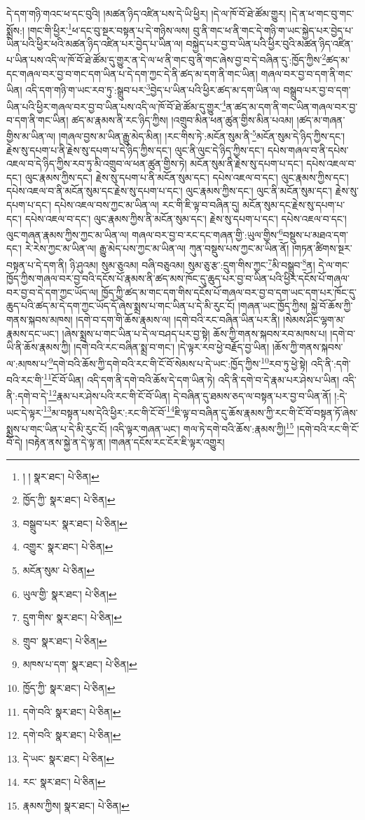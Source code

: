 དེ་དག་གཉི་གའང་ཕ་དང་བུའི། །མཚན་ཉིད་འཛིན་པས་དེ་ཡི་ཕྱིར། །དེ་ལ་ཁོ་བོ་ཐེ་ཚོམ་གྱུར། །དེ་ན་ཕ་གང་བུ་གང་སྨྲོས:། །གང་གི་ཕྱིར་\footnote{། །  སྣར་ཐང་།  པེ་ཅིན། }ཕ་དང་བུ་སྔར་བསྟན་པ་དེ་གཉིས་ལས། བུ་ནི་གང་ཕ་ནི་གང་དེ་གཉི་ག་ཡང་སྐྱེད་པར་བྱེད་པ་ཡིན་པའི་ཕྱིར་ཕའི་མཚན་ཉིད་འཛིན་པར་བྱེད་པ་ཡིན་ལ། བསྐྱེད་པར་བྱ་བ་ཡིན་པའི་ཕྱིར་བུའི་མཚན་ཉིད་འཛིན་པ་ཡིན་པས་འདི་ལ་ཁོ་བོ་ཐེ་ཚོམ་དུ་གྱུར་ན་དེ་ལ་ཕ་ནི་གང་བུ་ནི་གང་ཞེས་བྱ་བ་དེ་བཞིན་དུ་:ཁྱོད་ཀྱིས་\footnote{ཁྱོད་ཀྱི་  སྣར་ཐང་།  པེ་ཅིན། }ཚད་མ་དང་གཞལ་བར་བྱ་བ་གང་དག་ཡིན་པ་དེ་དག་ཀྱང་དེ་ནི་ཚད་མ་དག་ནི་གང་ཡིན། གཞལ་བར་བྱ་བ་དག་ནི་གང་ཡིན། འདི་དག་གཉི་ག་ཡང་རབ་ཏུ་:སྒྲུབ་པར་\footnote{བསྒྲུབ་པར་  སྣར་ཐང་།  པེ་ཅིན། }བྱེད་པ་ཡིན་པའི་ཕྱིར་ཚད་མ་དག་ཡིན་ལ། བསྒྲུབ་པར་བྱ་བ་དག་ཡིན་པའི་ཕྱིར་གཞལ་བར་བྱ་བ་ཡིན་པས་འདི་ལ་ཁོ་བོ་ཐེ་ཚོམ་དུ་གྱུར་\footnote{འགྱུར་  སྣར་ཐང་།  པེ་ཅིན། }ན་ཚད་མ་དག་ནི་གང་ཡིན་གཞལ་བར་བྱ་བ་དག་ནི་གང་ཡིན། ཚད་མ་རྣམས་ནི་རང་ཉིད་ཀྱིས། །འགྲུབ་མིན་ཕན་ཚུན་གྱིས་མིན་པའམ། །ཚད་མ་གཞན་གྱིས་མ་ཡིན་ལ། །གཞལ་བྱས་མ་ཡིན་རྒྱུ་མེད་མིན། །རང་གིས་ཏེ་:མངོན་སུམ་ནི་\footnote{མངོན་སུམ་  པེ་ཅིན། }མངོན་སུམ་དེ་ཉིད་ཀྱིས་དང་། རྗེས་སུ་དཔག་པ་ནི་རྗེས་སུ་དཔག་པ་དེ་ཉིད་ཀྱིས་དང་། ལུང་ནི་ལུང་དེ་ཉིད་ཀྱིས་དང་། དཔེས་གཞལ་བ་ནི་དཔེས་འཇལ་བ་དེ་ཉིད་ཀྱིས་རབ་ཏུ་མི་འགྲུབ་ལ་ཕན་ཚུན་གྱིས་ཏེ། མངོན་སུམ་ནི་རྗེས་སུ་དཔག་པ་དང་། དཔེས་འཇལ་བ་དང་། ལུང་རྣམས་ཀྱིས་དང་། རྗེས་སུ་དཔག་པ་ནི་མངོན་སུམ་དང་། དཔེས་འཇལ་བ་དང་། ལུང་རྣམས་ཀྱིས་དང་། དཔེས་འཇལ་བ་ནི་མངོན་སུམ་དང་རྗེས་སུ་དཔག་པ་དང་། ལུང་རྣམས་ཀྱིས་དང་། ལུང་ནི་མངོན་སུམ་དང་། རྗེས་སུ་དཔག་པ་དང་། དཔེས་འཇལ་བས་ཀྱང་མ་ཡིན་ལ། རང་གི་ཇི་ལྟ་བ་བཞིན་དུ། མངོན་སུམ་དང་རྗེས་སུ་དཔག་པ་དང་། དཔེས་འཇལ་བ་དང་། ལུང་རྣམས་ཀྱིས་ནི་མངོན་སུམ་དང་། རྗེས་སུ་དཔག་པ་དང་། དཔེས་འཇལ་བ་དང་། ལུང་གཞན་རྣམས་ཀྱིས་ཀྱང་མ་ཡིན་ལ། གཞལ་བར་བྱ་བ་རང་དང་གཞན་གྱི་:ཡུལ་གྱིས་\footnote{ཡུལ་གྱི་  སྣར་ཐང་།  པེ་ཅིན། }བསྡུས་པ་མཐའ་དག་དང་། རེ་རེས་ཀྱང་མ་ཡིན་ལ། རྒྱུ་མེད་པས་ཀྱང་མ་ཡིན་ལ། ཀུན་བསྡུས་པས་ཀྱང་མ་ཡིན་ནོ། །གཏན་ཚིགས་སྔར་བསྟན་པ་དེ་དག་ནི། ཉི་ཤུའམ། སུམ་ཅུའམ། བཞི་བཅུའམ། སུམ་ཅུ་རྩ་:དྲུག་གིས་ཀྱང་\footnote{དྲུག་གིས་  སྣར་ཐང་།  པེ་ཅིན། }མི་བསྒྲུབ་\footnote{གྲུབ་  སྣར་ཐང་།  པེ་ཅིན། }ན། དེ་ལ་གང་ཁྱོད་ཀྱིས་གཞལ་བར་བྱ་བའི་དངོས་པོ་རྣམས་ནི་ཚད་མས་ཁོང་དུ་ཆུད་པར་བྱ་བ་ཡིན་པའི་ཕྱིར་དངོས་པོ་གཞལ་བར་བྱ་བ་དེ་དག་ཀྱང་ཡོད་ལ། ཁྱོད་ཀྱི་ཚད་མ་གང་དག་གིས་དངོས་པོ་གཞལ་བར་བྱ་བ་དག་ཡང་དག་པར་ཁོང་དུ་ཆུད་པའི་ཚད་མ་དེ་དག་ཀྱང་ཡོད་དོ་ཞེས་སྨྲས་པ་གང་ཡིན་པ་དེ་མི་རུང་ངོ། །གཞན་ཡང་ཁྱོད་ཀྱིས། སྐྱེ་བོ་ཆོས་ཀྱི་གནས་སྐབས་མཁས། །དགེ་བ་དག་གི་ཆོས་རྣམས་ལ། །དགེ་བའི་རང་བཞིན་ཡིན་པར་ནི། །སེམས་ཤིང་ལྷག་མ་རྣམས་དང་ཡང་། །ཞེས་སྨྲས་པ་གང་ཡིན་པ་དེ་ལ་བཤད་པར་བྱ་སྟེ། ཆོས་ཀྱི་གནས་སྐབས་རབ་མཁས་པ། །དགེ་བ་ཡི་ནི་ཆོས་རྣམས་ཀྱི། །དགེ་བའི་རང་བཞིན་སྨྲ་བ་གང་། །དེ་ལྟར་རབ་ཕྱེ་བརྗོད་བྱ་ཡིན། །ཆོས་ཀྱི་གནས་སྐབས་ལ་:མཁས་པ་\footnote{མཁས་པ་དག་  སྣར་ཐང་།  པེ་ཅིན། }དགེ་བའི་ཆོས་ཀྱི་དགེ་བའི་རང་གི་ངོ་བོ་སེམས་པ་དེ་ཡང་:ཁྱོད་ཀྱིས་\footnote{ཁྱོད་ཀྱི་  སྣར་ཐང་།  པེ་ཅིན། }རབ་ཏུ་ཕྱེ་སྟེ། འདི་ནི་:དགེ་བའི་རང་གི་\footnote{དགེ་བའི་  སྣར་ཐང་།  པེ་ཅིན། }ངོ་བོ་ཡིན། འདི་དག་ནི་དགེ་བའི་ཆོས་དེ་དག་ཡིན་ཏེ། འདི་ནི་དགེ་བ་དེ་རྣམ་པར་ཤེས་པ་ཡིན། འདི་ནི་:དགེ་བ་དེ་\footnote{དགེ་བའི་  སྣར་ཐང་།  པེ་ཅིན། }རྣམ་པར་ཤེས་པའི་རང་གི་ངོ་བོ་ཡིན། དེ་བཞིན་དུ་ཐམས་ཅད་ལ་བསྟན་པར་བྱ་བ་ཡིན་ནོ། །:དེ་ཡང་དེ་ལྟར་\footnote{དེ་ཡང་  སྣར་ཐང་།  པེ་ཅིན། }མ་བསྟན་པས་དེའི་ཕྱིར་:རང་གི་ངོ་བོ་\footnote{རང་  སྣར་ཐང་།  པེ་ཅིན། }ཇི་ལྟ་བ་བཞིན་དུ་ཆོས་རྣམས་ཀྱི་རང་གི་ངོ་བོ་བསྟན་ཏོ་ཞེས་སྨྲས་པ་གང་ཡིན་པ་དེ་མི་རུང་ངོ། །འདི་ལྟར་གཞན་ཡང་། གལ་ཏེ་དགེ་བའི་ཆོས་:རྣམས་ཀྱི།\footnote{རྣམས་ཀྱིས།  སྣར་ཐང་།  པེ་ཅིན། } །དགེ་བའི་རང་གི་ངོ་བོ་དེ། །བརྟེན་ནས་སྐྱེ་ན་དེ་ལྟ་ན། །གཞན་དངོས་རང་ངོར་ཇི་ལྟར་འགྱུར། 